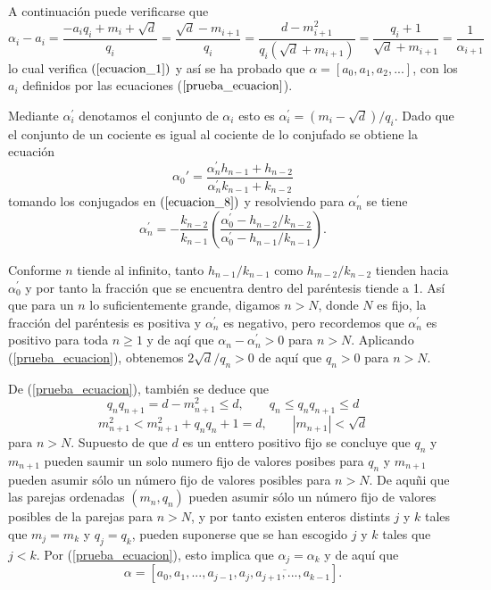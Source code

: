 \documentclass[11pt, article]{article}
\begin{document}
    A continuación puede verificarse que 
        \[
        \alpha_i-a_i=\dfrac{-a_iq_i+m_i+\sqrt{d}}{q_i}=\dfrac{\sqrt{d}-m_{i+1}}{q_i}=\dfrac{d-m_{i+1}^2}{q_i(\sqrt{d}+m_{i+1})}=\dfrac{q_i+1}{\sqrt{d}+m_{i+1}}=\dfrac{1}{\alpha_{i+1}}
        \]
    lo cual verifica $(\ref{ecuacion_1})$ y así se ha probado que $\alpha=[a_0,a_1,a_2,...]$, con los $a_i$ definidos por las ecuaciones ($\ref{prueba_ecuacion}$).
    
    Mediante $\alpha^{'}_{i}$ denotamos el conjunto de $\alpha_i$ esto es $\alpha^{'}_{i}=(m_i-\sqrt{d})/q_i$. Dado que el conjunto de un cociente es igual al cociente de lo conjufado se obtiene la ecuación
        \[
        \alpha_0{'}=\dfrac{\alpha_n^{'}h_{n-1}+h_{n-2}}{\alpha_n^{'}k_{n-1}+k_{n-2}}
        \]
    tomando los conjugados en $(\ref{ecuacion_8})$ y resolviendo para $\alpha_n^{'}$ se tiene
        \[
        \alpha_n^{'}=-\dfrac{k_{n-2}}{k_{n-1}}\left(\dfrac{\alpha_0^{'}-h_{n-2}/k_{n-2}}{\alpha_0^{'}-h_{n-1}/k_{n-1}}\right).
        \]
        
    Conforme $n$ tiende al infinito, tanto $h_{n-1}/k_{n-1}$ como $h_{m-2}/k_{n-2}$ tienden hacia $\alpha_0^{'}$ y por tanto la fracción que se encuentra dentro del paréntesis tiende a 1. Así que para un $n$ lo suficientemente grande, digamos $n>N$, 
    donde $N$ es fijo, la fracción del paréntesis es positiva y $\alpha_n^{'}$ es negativo, pero recordemos que $\alpha_n^{'}$ es positivo para toda
    $n\geq 1$ y de aqí que $\alpha_n - \alpha_n^{'}>0$ para $n>N$. Aplicando (\ref{prueba_ecuacion}), obtenemos $2 \sqrt{d}/q_{n} >0$
    de aquí que $q_n>0$ para $n>N$.
    
    De (\ref{prueba_ecuacion}), también se deduce que 
        \[
        q_nq_{n+1}=d-m^2_{n+1}\leq d, \qquad q_n\leq q_nq_{n+1}\leq d 
        \]
        \[
        m^2_{n+1} < m_{n+1}^2+q_n q_n+1=d, \qquad |m_{n+1}|<\sqrt{d}
        \]
    para $n>N$. Supuesto de que $d$ es un enttero positivo fijo se concluye que $q_n$ y $m_{n+1}$ pueden saumir un solo numero fijo de valores posibes para $q_n$ y $m_{n+1}$ pueden asumir sólo un número fijo de valores posibles para $n>N$. De aquñi que las parejas ordenadas $(m_n,q_n)$ pueden asumir sólo un número fijo de valores posibles de la parejas para $n>N$, y por tanto existen enteros distints $j$ y $k$ tales que $m_j=m_k$ y $q_j=q_k$, pueden suponerse que se han escogido $j$ y $k$ tales que $j<k$. Por (\ref{prueba_ecuacion}), esto implica que $\alpha_j=\alpha_k$ y de aquí que
        \[
        \alpha=[a_0,a_1,...,a_{j-1},\overline{a_j,a_{j+1},...,a_{k-1}}].
        \]
    
\end{document}
